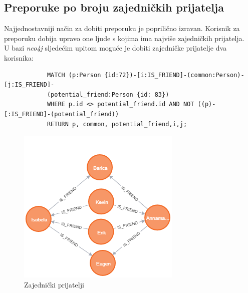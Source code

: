 \documentclass[titlepage, 12pt]{scrartcl}
\begin{document}
	\subsection*{Preporuke po broju zajedničkih prijatelja}
	Najjednostavniji način za dobiti preporuku je poprilično izravan. Korisnik za preporuku dobija upravo one ljude s kojima ima najviše zajedničkih prijatelja. \\
	U bazi \emph{neo4j} sljedećim upitom moguće je dobiti zajedničke prijatelje dva korisnika:
	\begin{samepage}
		\begin{verbatim}
			MATCH (p:Person {id:72})-[i:IS_FRIEND]-(common:Person)-[j:IS_FRIEND]-
			(potential_friend:Person {id: 83}) 
			WHERE p.id <> potential_friend.id AND NOT ((p)-[:IS_FRIEND]-(potential_friend)) 
			RETURN p, common, potential_friend,i,j;
		\end{verbatim}
	\end{samepage}
	\begin{figure}[h]
		\centering
		\includegraphics[scale=0.7]{slike/common_friends_query.png}
		\caption{Zajednički prijatelji}
		\label{fig:common_friends}
	\end{figure}
	
\end{document}
